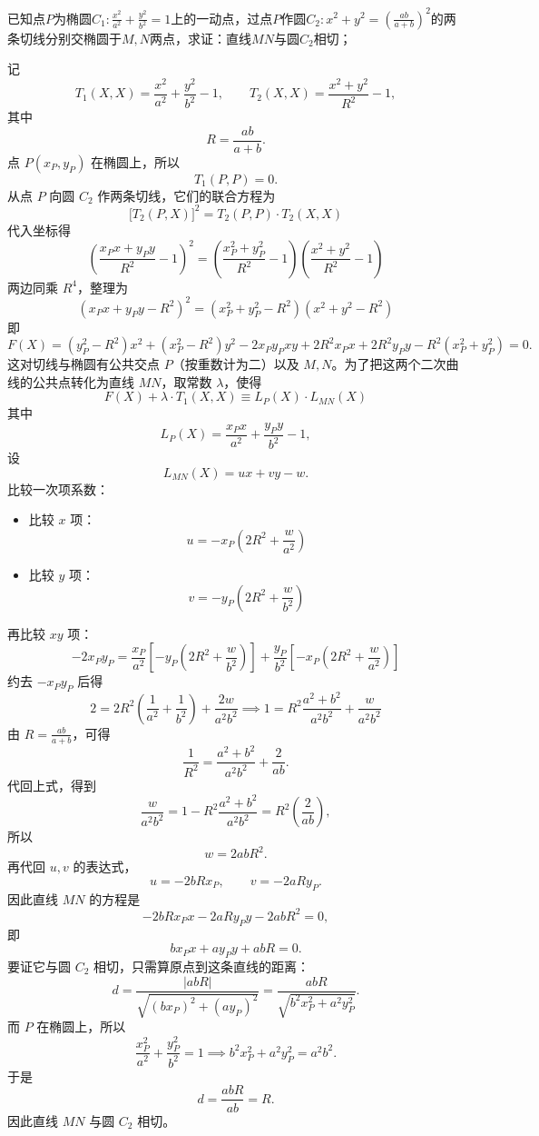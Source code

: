 \begin{exercise}[中心三相切]
已知点$P$为椭圆$C_1:\frac{x^2}{a^2}+\frac{y^2}{b^2}=1$上的一动点，过点$P$作圆$C_2:x^2+y^2=(\frac{ab}{a+b})^2$的两条切线分别交椭圆于$M,N$两点，求证：直线$MN$与圆$C_2$相切；
\end{exercise}
\begin{solution}
记
\[
T_1(X,X) = \frac{x^2}{a^2} + \frac{y^2}{b^2} - 1,\qquad
T_2(X,X) = \frac{x^2+y^2}{R^2} - 1,
\]
其中
$$R = \frac{ab}{a+b}.$$
点 $P(x_P,y_P)$ 在椭圆上，所以
$$T_1(P,P)=0.$$
从点 $P$ 向圆 $C_2$ 作两条切线，它们的联合方程为
$$\big[T_2(P,X)\big]^2 = T_2(P,P) \cdot T_2(X,X)$$
代入坐标得
$$\left( \frac{x_P x + y_P y}{R^2} - 1 \right)^2 = \left( \frac{x_P^2 + y_P^2}{R^2} - 1 \right) \left( \frac{x^2 + y^2}{R^2} - 1 \right)$$
两边同乘 $R^4$，整理为
$$(x_P x + y_P y - R^2)^2 = (x_P^2 + y_P^2 - R^2)(x^2 + y^2 - R^2)$$
即
$$F(X) = (y_P^2 - R^2)x^2 + (x_P^2 - R^2)y^2 - 2x_P y_P xy + 2R^2 x_P x + 2R^2 y_P y - R^2(x_P^2 + y_P^2) = 0.$$
这对切线与椭圆有公共交点 $P$（按重数计为二）以及 $M,N$。为了把这两个二次曲线的公共点转化为直线 $MN$，取常数 $\lambda$，使得
$$F(X) + \lambda \cdot T_1(X,X) \equiv L_P(X) \cdot L_{MN}(X)$$
其中
$$L_P(X) = \frac{x_P x}{a^2} + \frac{y_P y}{b^2} - 1,$$
设
$$L_{MN}(X) = ux + vy - w.$$
比较一次项系数：
\begin{itemize}
\item 比较 $x$ 项：$$u = -x_P \left( 2R^2 + \frac{w}{a^2} \right)$$
\item 比较 $y$ 项：$$v = -y_P \left( 2R^2 + \frac{w}{b^2} \right)$$
\end{itemize}
再比较 $xy$ 项：
$$-2x_P y_P = \frac{x_P}{a^2}\left[ -y_P \left( 2R^2 + \frac{w}{b^2} \right) \right] + \frac{y_P}{b^2}\left[ -x_P \left( 2R^2 + \frac{w}{a^2} \right) \right]$$
约去 $-x_Py_P$ 后得
$$2 = 2R^2 \left( \frac{1}{a^2} + \frac{1}{b^2} \right) + \frac{2w}{a^2 b^2} \implies 1 = R^2 \frac{a^2+b^2}{a^2 b^2} + \frac{w}{a^2 b^2}$$
由 $R = \frac{ab}{a+b}$，可得
$$\frac{1}{R^2} = \frac{a^2+b^2}{a^2b^2} + \frac{2}{ab}.$$
代回上式，得到
$$\frac{w}{a^2 b^2} = 1 - R^2 \frac{a^2+b^2}{a^2 b^2} = R^2 \left( \frac{2}{ab} \right),$$
所以
$$w = 2ab R^2.$$
再代回 $u,v$ 的表达式，
$$u = -2bRx_P,\qquad v = -2aRy_P.$$
因此直线 $MN$ 的方程是
$$-2b R x_P x - 2a R y_P y - 2ab R^2 = 0,$$
即
$$b x_P x + a y_P y + ab R = 0.$$
要证它与圆 $C_2$ 相切，只需算原点到这条直线的距离：
$$d = \frac{|ab R|}{\sqrt{(b x_P)^2 + (a y_P)^2}} = \frac{ab R}{\sqrt{b^2 x_P^2 + a^2 y_P^2}}.$$
而 $P$ 在椭圆上，所以
$$\frac{x_P^2}{a^2} + \frac{y_P^2}{b^2} = 1 \implies b^2 x_P^2 + a^2 y_P^2 = a^2 b^2.$$
于是
$$d = \frac{ab R}{ab} = R.$$
因此直线 $MN$ 与圆 $C_2$ 相切。
\end{solution}

